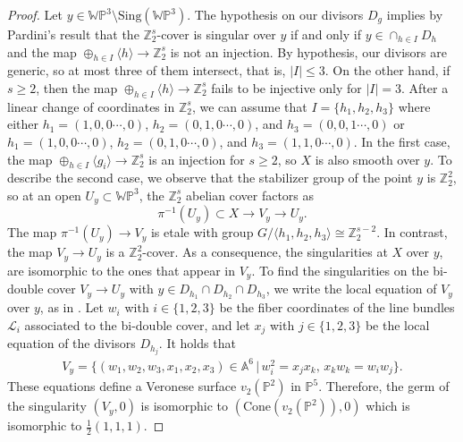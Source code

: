 \documentclass[12pt,twoside,]{amsart}
\theoremstyle{plain}
\theoremstyle{definition}
\begin{document}
\begin{proof}
Let $y \in \mathbb{WP}^3 \setminus \text{Sing}(\mathbb{WP}^3)$. 
The hypothesis on our divisors $D_g$ implies by Pardini's result \cite[Prop 3.1]{pardini1991abelian} that the $\mathbb{Z}_2^s$-cover is singular over $y$ if and only if   
\( y \in \cap_{h \in I} D_{h}\) and the map 
$\oplus_{h \in I} \langle h \rangle \rightarrow  \mathbb{Z}_2^s$ is not an injection. By hypothesis, our divisors are generic, so at most three of them intersect, that is, $|I| \leq 3$. 
On the other hand, if  $s \geq 2$, then the map $\oplus_{h \in I} \langle h \rangle \rightarrow  \mathbb{Z}_2^s$ fails to be injective only for $|I| =3$.  After a linear change of coordinates in $\mathbb{Z}_2^s$, we can assume that $I = \{h_1, h_2, h_3 \}$ where either 
$h_1 = (1,0,0 \cdots, 0)$, $h_2 = (0,1,0 \cdots, 0)$, 
and $h_3 = (0,0,1 \cdots, 0)$ or 
$h_1 = (1,0,0 \cdots, 0)$, $h_2 = (0,1,0 \cdots, 0)$, 
and $h_3 = (1,1,0 \cdots, 0)$. In the first case, the map 
$\oplus_{h \in I} \langle g_i \rangle \rightarrow  \mathbb{Z}_2^s$ is an injection for $s \geq 2$, so $X$ is also smooth over $y$.  To describe the second case, we observe that the stabilizer group of the point $y$ is $\mathbb{Z}_2^2$, so at an open $U_y \subset \mathbb{WP}^3$, the $\mathbb{Z}_2^s$ abelian cover factors as 
\[
\pi^{-1}({U_y}) \subset X \rightarrow V_y \rightarrow U_y.
\]
The map $\pi^{-1}(U_y) \rightarrow V_y $ is etale with group  $G / \langle h_1, h_2, h_3 \rangle \cong \mathbb{Z}_2^{s-2}$. In contrast, 
the map $V_y \rightarrow U_y$ is a $\mathbb{Z}_2^2$-cover. As a consequence, the singularities at $X$ over $y$, are isomorphic to the ones that appear in $V_y$.
To find the singularities on the bi-double cover 
$V_y \rightarrow U_y $
with $y \in D_{h_1} \cap D_{h_2} \cap D_{h_3}$, we write the local equation of $V_y$ over $y$, as in \cite[Eq (2.4)]{catanese1984moduli}. Let $w_i$ with $i\in \{1, 2, 3\}$ be the fiber coordinates of the line bundles $\mathcal{L}_i$ associated to the bi-double cover, and let $x_j$ with $j \in \{1, 2, 3\}$ be the local equation of the divisors $D_{h_j}$. It holds that
\begin{align*}
V_y = 
\{
(w_1, w_2, w_3, x_1, x_2, x_3) \in \mathbb{A}^6\, | \, 
w_i^2 = x_jx_k,\,  x_kw_k = w_iw_j
\}.
\end{align*}
These equations define a Veronese surface $v_2(\mathbb{P}^2)$ in $\mathbb{P}^5$. Therefore, the germ of the singularity $\left( V_y, 0 \right)$ is isomorphic to 
$\left( 
\text{Cone}\left( 
v_2(\mathbb{P}^2)
\right), 0
\right)$ which is isomorphic to $\frac{1}{2}(1,1,1)$.  



\end{proof}
\end{document}
